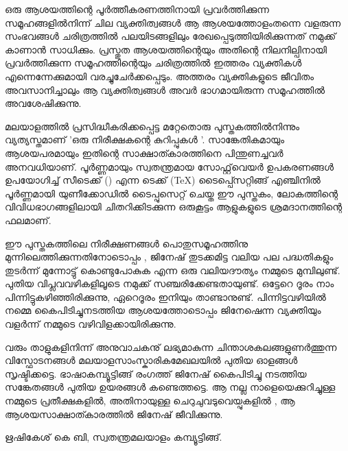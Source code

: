 
ഒരു ആശയത്തിന്റെ പൂര്‍ത്തീകരണത്തിനായി പ്രവര്‍ത്തിക്കുന്ന സമൂഹങ്ങളില്‍നിന്ന് ചില വ്യക്തിത്വങ്ങള്‍ ആ ആശയത്തോളംതന്നെ
വളരുന്ന സംഭവങ്ങള്‍ ചരിത്രത്തില്‍ പലയിടങ്ങളിലും  രേഖപ്പെടുത്തിയിരിക്കുന്നത് നമുക്ക് കാണാൻ സാധിക്കും. പ്രസ്തുത ആശയത്തിന്റെയും  
അതിന്റെ നിലനില്പിനായി പ്രവര്‍ത്തിക്കുന്ന സമൂഹത്തിന്റെയും  ചരിത്രത്തില്‍ ഇത്തരം  വ്യക്തികള്‍ എന്നെന്നേക്കുമായി വരച്ചുചേര്‍ക്കപ്പെടും. 
അത്തരം വ്യക്തികളുടെ ജീവിതം അവസാനിച്ചാലും ആ വ്യക്തിത്വങ്ങള്‍ അവര്‍ ഭാഗമായിരുന്ന സമൂഹത്തില്‍ അവശേഷിക്കുന്നു. 


മലയാളത്തില്‍ പ്രസിദ്ധീകരിക്കപ്പെട്ട മറ്റേതൊരു പുസ്തകത്തില്‍നിന്നും വ്യത്യസ്തമാണ് 'ഒരു നിരീക്ഷകന്റെ കുറിപ്പുകള്‍ '. 
സാങ്കേതികമായും ആശയപരമായും ഇതിന്റെ സാക്ഷാത്കാരത്തിനെ പിന്തുണച്ചവര്‍ അനവധിയാണ്. പൂര്‍ണ്ണമായും സ്വതന്ത്രമായ 
സോഫ്റ്റ്‌‌വെയര്‍ ഉപകരണങ്ങള്‍ ഉപയോഗിച്ച് സീടെക്ക് (\XeTeX) എന്ന ടെക്ക് (\TeX) ടൈപ്പ്സെറ്റിങ്ങ് എഞ്ചിനില്‍ പൂര്‍ണ്ണമായി യുണീക്കോഡില്‍ ടൈപ്പുസെറ്റ് ചെയ്ത
ഈ പുസ്തകം, ലോകത്തിന്റെ വിവിധഭാഗങ്ങളിലായി ചിതറിക്കിടക്കുന്ന ഒരുകൂട്ടം ആളുകളുടെ ശ്രമദാനത്തിന്റെ ഫലമാണ്.   

ഈ പുസ്തകത്തിലെ നിരീക്ഷണങ്ങള്‍ പൊതുസമൂഹത്തിനു മുന്നിലെത്തിക്കുന്നതിനോടൊപ്പം , ജിനേഷ് തുടക്കമിട്ട വലിയ പല പദ്ധതികളും  
തുടര്‍ന്ന് മുന്നോട്ടു് കൊണ്ടുപോകുക എന്ന ഒരു വലിയദൗത്യം  നമ്മുടെ മുമ്പിലുണ്ട്. പുതിയ വിപ്ലവവഴികളിലൂടെ നമുക്ക് സഞ്ചരിക്കേണ്ടതായുണ്ട്. 
ഒട്ടേറെ ദൂരം നാം പിന്നിട്ടുകഴിഞ്ഞിരിക്കുന്നു, ഏറെദൂരം ഇനിയും താണ്ടാനുണ്ട്. പിന്നിട്ടവഴിയില്‍ നമ്മെ കൈപിടിച്ചുനടത്തിയ ആശയത്തോടൊപ്പം  
ജിനേഷെന്ന വ്യക്തിയും  വളര്‍ന്ന് നമ്മുടെ വഴിവിളക്കായിരിക്കുന്നു.

വരും  താളുകളിനിന്ന് അനുവാചകനു് ലഭ്യമാകുന്ന ചിന്താശകലങ്ങളുണര്‍ത്തുന്ന വിസ്ഫോടനങ്ങള്‍ മലയാളസാംസ്കാരികമേഖലയില്‍ പുതിയ ഓളങ്ങള്‍ സൃഷ്ടിക്കട്ടെ. 
ഭാഷാകമ്പ്യൂട്ടിങ്ങ് രംഗത്ത് ജിനേഷ് കൈപിടിച്ചു നടത്തിയ സങ്കേതങ്ങള്‍ പുതിയ ഉയരങ്ങള്‍ കണ്ടെത്തട്ടെ.  ആ നല്ല നാളെയെക്കുറിച്ചുള്ള നമ്മുടെ പ്രതീക്ഷകളില്‍,
അതിനായുള്ള ചെറുചുവടുവെയ്പുകളില്‍ , ആ ആശയസാക്ഷാത്കാരത്തില്‍ ജിനേഷ് ജീവിക്കുന്നു. 

\begin{flushright}ഋഷികേശ് കെ ബി,  സ്വതന്ത്രമലയാളം കമ്പ്യൂട്ടിങ്ങ്. \end{flushright}
\newpage




